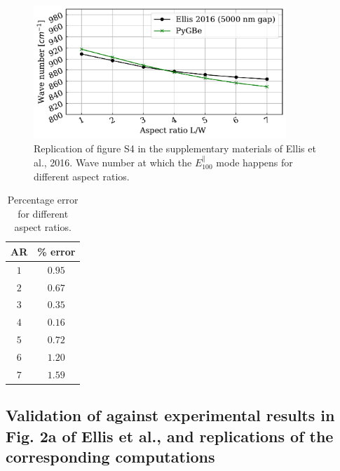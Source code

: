 \begin{figure}
    \centering
    \includegraphics[width=0.85\textwidth]{AR_rep_FS4_Ellis2016.pdf} 
    \caption{Replication of figure S4 in the supplementary materials of Ellis et al., 2016. Wave
    number at which the $E^{\parallel}_{100}$ mode happens for different aspect ratios.}
    \label{fig:rep_FS4_ellis}
 \end{figure}
 
 \begin{table}
    \centering
    \caption{Percentage error for different aspect ratios.} 
    \label{tab:err_AR}
    \begin{tabular}{c c}
    \hline%
    AR & \% error \\
    \hline%
     $1$ & $0.95$ \\
     $2$ & $0.67$ \\
     $3$ & $0.35$ \\
     $4$ & $0.16$ \\
     $5$ & $0.72$ \\
     $6$ & $1.20$ \\
     $7$ & $1.59$ \\
    \hline%
    \end{tabular}
\end{table}

\subsection{Validation of \pygbe against experimental results in Fig. 2a of Ellis et al., and replications
of the corresponding computations}\label{ssec:validation}

